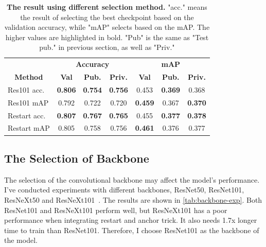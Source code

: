 \documentclass[10pt,twocolumn,letterpaper]{article}
\begin{document}
\begin{table}[h]
  \centering
  \setlength{\tabcolsep}{3.5pt}
  \begin{tabular}{lcccccc}
    \toprule
                                        & \multicolumn{3}{c}{\textbf{Accuracy}}            & \multicolumn{3}{c}{\textbf{mAP}}                 \\
    \cmidrule[0.3pt](lr){2-4} \cmidrule(lr){5-7}
    \multicolumn{1}{c}{\textbf{Method}} & \textbf{Val}   & \textbf{Pub.}  & \textbf{Priv.} & \textbf{Val}   & \textbf{Pub.}  & \textbf{Priv.} \\
    \midrule
    Res101 acc.                         & \textbf{0.806} & \textbf{0.754} & \textbf{0.756} & 0.453          & \textbf{0.369} & 0.368          \\
    Res101 mAP                          & 0.792          & 0.722          & 0.720          & \textbf{0.459} & 0.367          & \textbf{0.370} \\
    \midrule
    Restart acc.                        & \textbf{0.807} & \textbf{0.767} & \textbf{0.765} & 0.455          & \textbf{0.377} & \textbf{0.378} \\
    Restart mAP                         & 0.805          & 0.758          & 0.756          & \textbf{0.461} & 0.376          & 0.377          \\
    \bottomrule
  \end{tabular}
  \caption{\textbf{The result using different selection method.} "acc." 
    means the result of selecting the best checkpoint based on the validation
    accuracy, while "mAP" selects based on the mAP. The higher values are
    highlighted in bold. "Pub" is the same as "Test pub." in previous section,
    as well as "Priv."
  }
  \label{tab:best-select}
\end{table}

\subsection*{The Selection of Backbone}

The selection of the convolutional backbone may affect the model's performance.
I've conducted experiments with different backbones, ResNet50, ResNet101,
ResNeXt50 and ResNeXt101~\cite{ResNeXt}. The results are shown in \cref{tab:backbone-exp}.
Both ResNet101 and ResNeXt101 perform well, but ResNeXt101 has a poor performance
when integrating restart and anchor trick. It also needs 1.7x longer time to train
than ResNet101. Therefore, I choose ResNet101 as the backbone of the model.
\end{document}
